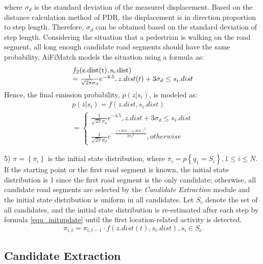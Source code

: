 \documentclass[conference]{IEEEtran}
\begin{document}
where $\sigma _d$ is the standard deviation of the measured displacement. Based on the distance calculation method of PDR, the displacement is in direction proportion to step length. Therefore, $\sigma _d$ can be obtained based on the standard deviation of step length. Considering the situation that a pedestrian is walking on the road segment, all long enough candidate road segments should have the same probability, AiFiMatch models the situation using a formula as:
\begin{equation}
\begin{array}{l}
{f_2}({\rm{z}}.{\rm{dist}}({\rm{t}}),{{\rm{s}}_{\rm{i}}}.{\rm{dist}})\\
= \frac{1}{{\sqrt {2\pi } {\sigma _d}}}{e^{ - 4.5}},z.dist(t) + 3{\sigma _d} \le {s_i}.dist
\end{array}
\end{equation}
Hence, the final emission probability, $p(z|s_i)$, is modeled as:
\begin{equation}
\begin{array}{l}
p(z|{s_i}) = f(z.dist,{s_i}.dist)\\
= \left\{ {\begin{array}{*{20}{l}}
	{\frac{1}{{\sqrt {2\pi } {\sigma _d}}}{e^{ - 4.5}},z.dist + 3{\sigma _d} \le {s_i}.dist}\\
	{\frac{1}{{\sqrt {2\pi } {\sigma _d}}}{e^{ - \frac{{{{(z.dist - {s_i}.dist)}^2}}}{{2{\sigma _d}^2}}}},otherwise}
	\end{array}} \right.
\end{array}
\end{equation}

5) $\pi  = \left\{ {{\pi _i}} \right\}$ is the initial state distribution, where ${\pi _i} = p\left\{ {{q_1} = {S_i}} \right\},1 \le i \le N$. If the starting point or the first road segment is known, the initial state distribution is $1$ since the first road segment is the only candidate; otherwise, all candidate road segments are selected by the \emph{Candidate Extraction} module and the initial state distribution is uniform in all candidates. Let $S_c$ denote the set of all candidates, and the initial state distribution is re-estimated after each step by formula \ref{equ_initupdate} until the first location-related activity is detected.
\begin{equation}
\label{equ_initupdate}
{\pi _{i,t}} = {\pi _{i,t - 1}} \cdot f(z.dist(t),{s_i}.dist),{s_i} \in {S_c}
\end{equation}

\subsection{Candidate Extraction}
\end{document}
